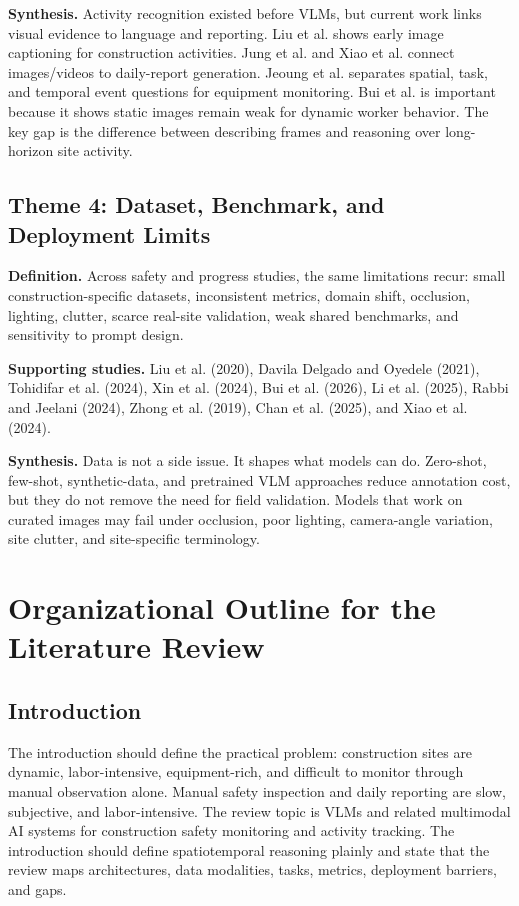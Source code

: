 \documentclass[10pt,letterpaper]{article}
\begin{document}
\textbf{Synthesis.} Activity recognition existed before VLMs, but current work links visual evidence to language and reporting. Liu et al. shows early image captioning for construction activities. Jung et al. and Xiao et al. connect images/videos to daily-report generation. Jeoung et al. separates spatial, task, and temporal event questions for equipment monitoring. Bui et al. is important because it shows static images remain weak for dynamic worker behavior. The key gap is the difference between describing frames and reasoning over long-horizon site activity.

\subsection{Theme 4: Dataset, Benchmark, and Deployment Limits}

\textbf{Definition.} Across safety and progress studies, the same limitations recur: small construction-specific datasets, inconsistent metrics, domain shift, occlusion, lighting, clutter, scarce real-site validation, weak shared benchmarks, and sensitivity to prompt design.

\textbf{Supporting studies.} Liu et al. (2020), Davila Delgado and Oyedele (2021), Tohidifar et al. (2024), Xin et al. (2024), Bui et al. (2026), Li et al. (2025), Rabbi and Jeelani (2024), Zhong et al. (2019), Chan et al. (2025), and Xiao et al. (2024).

\textbf{Synthesis.} Data is not a side issue. It shapes what models can do. Zero-shot, few-shot, synthetic-data, and pretrained VLM approaches reduce annotation cost, but they do not remove the need for field validation. Models that work on curated images may fail under occlusion, poor lighting, camera-angle variation, site clutter, and site-specific terminology.

\section{Organizational Outline for the Literature Review}

\subsection{Introduction}

The introduction should define the practical problem: construction sites are dynamic, labor-intensive, equipment-rich, and difficult to monitor through manual observation alone. Manual safety inspection and daily reporting are slow, subjective, and labor-intensive. The review topic is VLMs and related multimodal AI systems for construction safety monitoring and activity tracking. The introduction should define spatiotemporal reasoning plainly and state that the review maps architectures, data modalities, tasks, metrics, deployment barriers, and gaps.
\end{document}
